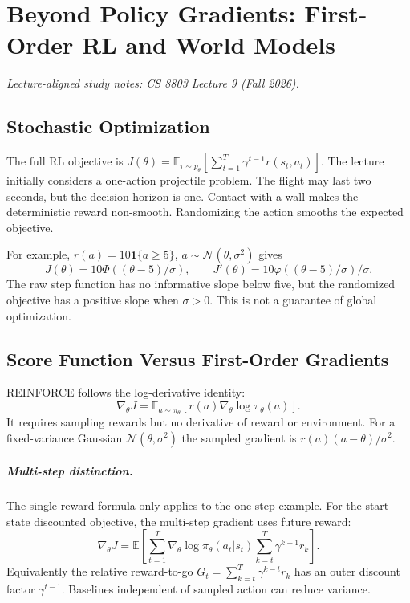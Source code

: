 \chapter{Beyond Policy Gradients: First-Order RL and World Models}
\label{ch:beyond_pg}
\noindent\textit{Lecture-aligned study notes: CS 8803 Lecture 9 (Fall 2026).}

\section{Stochastic Optimization}
The full RL objective is $J(\theta)=\mathbb{E}_{\tau\sim p_\theta}[\sum_{t=1}^T\gamma^{t-1}r(s_t,a_t)]$. The lecture initially considers a one-action projectile problem. The flight may last two seconds, but the decision horizon is one. Contact with a wall makes the deterministic reward non-smooth. Randomizing the action smooths the expected objective.

For example, $r(a)=10\mathbf{1}\{a\geq5\}$, $a\sim\mathcal N(\theta,\sigma^2)$ gives
\[
J(\theta)=10\Phi((\theta-5)/\sigma),\qquad
J'(\theta)=10\varphi((\theta-5)/\sigma)/\sigma.
\]
The raw step function has no informative slope below five, but the randomized objective has a positive slope when $\sigma>0$. This is not a guarantee of global optimization.

\section{Score Function Versus First-Order Gradients}
REINFORCE follows the log-derivative identity:
\[
\nabla_\theta J=\mathbb E_{a\sim\pi_\theta}
[r(a)\nabla_\theta\log\pi_\theta(a)].
\]
It requires sampling rewards but no derivative of reward or environment. For a fixed-variance Gaussian $\mathcal N(\theta,\sigma^2)$ the sampled gradient is $r(a)(a-\theta)/\sigma^2$.

\paragraph{Multi-step distinction.}
The single-reward formula only applies to the one-step example. For the start-state discounted objective, the multi-step gradient uses future reward:
\[
\nabla_\theta J=\mathbb E\left[
\sum_{t=1}^{T}\nabla_\theta\log\pi_\theta(a_t|s_t)
\sum_{k=t}^{T}\gamma^{k-1}r_k\right].
\]
Equivalently the relative reward-to-go $G_t=\sum_{k=t}^{T}\gamma^{k-t}r_k$ has an outer discount factor $\gamma^{t-1}$. Baselines independent of sampled action can reduce variance.

